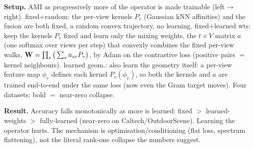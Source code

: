 \begin{table}[H]\centering\footnotesize
\caption{End-to-end learning of the geometry fails (Scenario 4).}
\label{tab:collapse}
\setlength{\tabcolsep}{5pt}
\end{table}

\noindent\textbf{Setup.} AMI as progressively more of the operator is made trainable (left$\to$right).
fixed+random: the per-view kernels $P_v$ (Gaussian kNN affinities) and the fusion are both fixed,
a random convex trajectory, no learning. fixed+learned wts: keep the kernels $P_v$ fixed and
learn only the mixing weights, the $t\times V$ matrix $a$ (one softmax over views per step) that
convexly combines the fixed per-view walks, $\mathbf{W}=\prod_s\big(\sum_v a_{sv}P_v\big)$, by Adam on the
contrastive loss (positive pairs $=$ kernel neighbours). learned geom.: also learn the geometry
itself: a per-view feature map $\phi_v$ defines each kernel $P_v(\phi_v)$, so both the kernels
and $a$ are trained end-to-end under the same loss (now even the Gram target moves). Four
datasets; bold $=$ near-zero collapse.

\noindent\textbf{Result.} Accuracy falls monotonically as more is learned: fixed $>$ learned-weights $>$
fully-learned (near-zero on Caltech/OutdoorScene). Learning the operator hurts. The mechanism is
optimisation/conditioning (flat loss, spectrum flattening), not the literal rank-one collapse the
numbers suggest.
